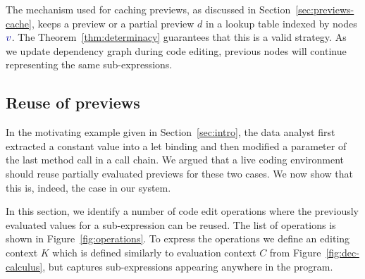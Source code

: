 \documentclass[acmsmall,anonymous,fleqn]{acmart}\settopmatter{printfolios=false,printccs=false,printacmref=false}
\theoremstyle{plain}
\theoremstyle{definition}
\newcommand{\bndclr}[1]{\textcolor{kvdclr}{#1}}
\begin{document}
The mechanism used for caching previews, as discussed in Section~\ref{sec:previews-cache},
keeps a preview or a partial preview $d$ in a lookup table indexed by nodes $\bndclr{v}$. The
Theorem~\ref{thm:determinacy} guarantees that this is a valid strategy. As we update dependency
graph during code editing, previous nodes will continue representing the same sub-expressions.


\subsection{Reuse of previews}
\label{sec:evaluation-reuse}

In the motivating example given in Section~\ref{sec:intro}, the data analyst first extracted a
constant value into a let binding and then modified a parameter of the last method call in a call
chain. We argued that a live coding environment should reuse partially evaluated previews for these
two cases. We now show that this is, indeed, the case in our system.

In this section, we identify a number of code edit operations where the previously evaluated
values for a sub-expression can be reused. The list of operations is shown in Figure~\ref{fig:operations}.
To express the operations we define an editing context $K$ which is defined
similarly to evaluation context $C$ from Figure~\ref{fig:dec-calculus}, but captures sub-expressions
appearing anywhere in the program.

\end{document}
